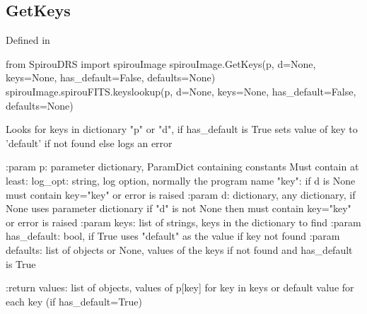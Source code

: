 \noindent\begin{minipage}{\textwidth}
\subsection{GetKeys}

Defined in \spirouImage{}

\begin{pythonbox}
from SpirouDRS import spirouImage
spirouImage.GetKeys(p, d=None, keys=None, has_default=False, defaults=None)
spirouImage.spirouFITS.keyslookup(p, d=None, keys=None, has_default=False, defaults=None)
\end{pythonbox}

\begin{pythondocstring}
Looks for keys in dictionary "p" or "d", if has_default is True sets
value of key to 'default' if not found else logs an error

:param p: parameter dictionary, ParamDict containing constants
    Must contain at least:
            log_opt: string, log option, normally the program name
            "key": if d is None must contain key="key" or error is raised
:param d: dictionary, any dictionary, if None uses parameter dictionary
          if "d" is not None then must contain key="key" or error is raised
:param keys: list of strings, keys in the dictionary to find
:param has_default: bool, if True uses "default" as the value if key
                    not found
:param defaults: list of objects or None, values of the keys if not
                 found and has_default is True

:return values: list of objects, values of p[key] for key in keys
                or default value for each key (if has_default=True)
\end{pythondocstring}
\end{minipage}


